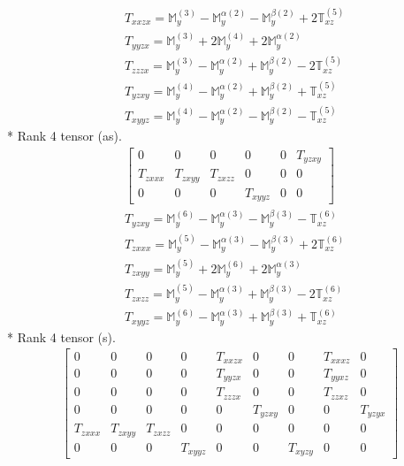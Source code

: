 \documentclass[fleqn,8pt,landscape]{jsarticle}
\begin{document}
\begin{align*}
& T_{xxzx} = \mathbb{M}_{y}^{(3)} - \mathbb{M}_{y}^{\alpha(2)} - \mathbb{M}_{y}^{\beta(2)} + 2 \mathbb{T}_{xz}^{(5)} \\
& T_{yyzx} = \mathbb{M}_{y}^{(3)} + 2 \mathbb{M}_{y}^{(4)} + 2 \mathbb{M}_{y}^{\alpha(2)} \\
& T_{zzzx} = \mathbb{M}_{y}^{(3)} - \mathbb{M}_{y}^{\alpha(2)} + \mathbb{M}_{y}^{\beta(2)} - 2 \mathbb{T}_{xz}^{(5)} \\
& T_{yzxy} = \mathbb{M}_{y}^{(4)} - \mathbb{M}_{y}^{\alpha(2)} + \mathbb{M}_{y}^{\beta(2)} + \mathbb{T}_{xz}^{(5)} \\
& T_{xyyz} = \mathbb{M}_{y}^{(4)} - \mathbb{M}_{y}^{\alpha(2)} - \mathbb{M}_{y}^{\beta(2)} - \mathbb{T}_{xz}^{(5)}
\end{align*}
* Rank 4 tensor (as).
\begin{align*}
\begin{bmatrix} 0 & 0 & 0 & 0 & 0 & T_{yzxy} \\ T_{zxxx} & T_{zxyy} & T_{zxzz} & 0 & 0 & 0 \\ 0 & 0 & 0 & T_{xyyz} & 0 & 0 \end{bmatrix}
\end{align*}
\begin{align*}
& T_{yzxy} = \mathbb{M}_{y}^{(6)} - \mathbb{M}_{y}^{\alpha(3)} - \mathbb{M}_{y}^{\beta(3)} - \mathbb{T}_{xz}^{(6)} \\
& T_{zxxx} = \mathbb{M}_{y}^{(5)} - \mathbb{M}_{y}^{\alpha(3)} - \mathbb{M}_{y}^{\beta(3)} + 2 \mathbb{T}_{xz}^{(6)} \\
& T_{zxyy} = \mathbb{M}_{y}^{(5)} + 2 \mathbb{M}_{y}^{(6)} + 2 \mathbb{M}_{y}^{\alpha(3)} \\
& T_{zxzz} = \mathbb{M}_{y}^{(5)} - \mathbb{M}_{y}^{\alpha(3)} + \mathbb{M}_{y}^{\beta(3)} - 2 \mathbb{T}_{xz}^{(6)} \\
& T_{xyyz} = \mathbb{M}_{y}^{(6)} - \mathbb{M}_{y}^{\alpha(3)} + \mathbb{M}_{y}^{\beta(3)} + \mathbb{T}_{xz}^{(6)}
\end{align*}
* Rank 4 tensor (s).
\begin{align*}
\begin{bmatrix} 0 & 0 & 0 & 0 & T_{xxzx} & 0 & 0 & T_{xxxz} & 0 \\ 0 & 0 & 0 & 0 & T_{yyzx} & 0 & 0 & T_{yyxz} & 0 \\ 0 & 0 & 0 & 0 & T_{zzzx} & 0 & 0 & T_{zzxz} & 0 \\ 0 & 0 & 0 & 0 & 0 & T_{yzxy} & 0 & 0 & T_{yzyx} \\ T_{zxxx} & T_{zxyy} & T_{zxzz} & 0 & 0 & 0 & 0 & 0 & 0 \\ 0 & 0 & 0 & T_{xyyz} & 0 & 0 & T_{xyzy} & 0 & 0 \end{bmatrix}
\end{align*}
\end{document}
